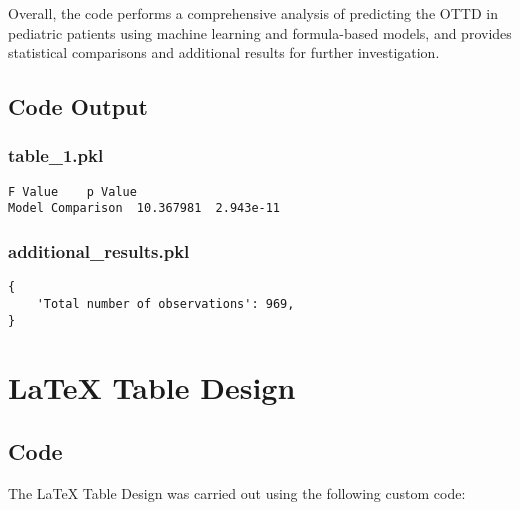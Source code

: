\documentclass[11pt]{article}
\begin{document}
Overall, the code performs a comprehensive analysis of predicting the OTTD in pediatric patients using machine learning and formula-based models, and provides statistical comparisons and additional results for further investigation.

\subsection{Code Output}

\subsubsection*{table\_1.pkl}

\begin{Verbatim}[tabsize=4]
                    F Value    p Value
Model Comparison  10.367981  2.943e-11
\end{Verbatim}

\subsubsection*{additional\_results.pkl}

\begin{Verbatim}[tabsize=4]
{
    'Total number of observations': 969,
}
\end{Verbatim}

\section{LaTeX Table Design}
\subsection{{Code}}
The LaTeX Table Design was carried out using the following custom code:
\end{document}
